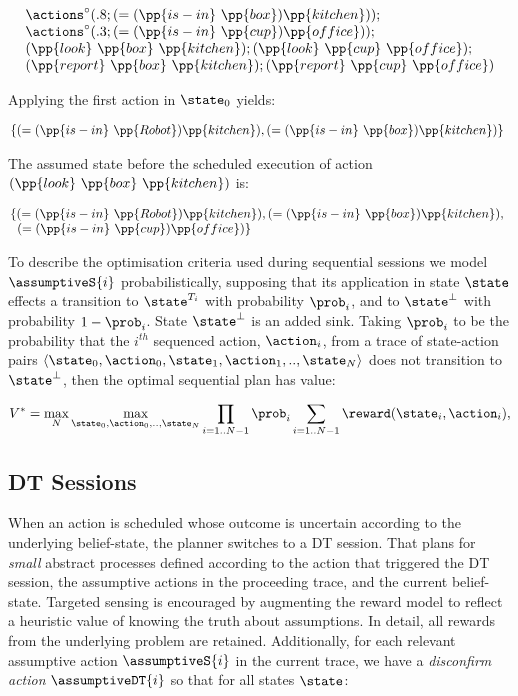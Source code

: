 \small
\[
\begin{array}{l}
\actions^{\circ}(.8;(=(\pp{is-in}~\pp{box})\pp{kitchen}));\\
\actions^{\circ}(.3;(=(\pp{is-in}~\pp{cup})\pp{office}));\\
(\pp{look}~\pp{box}~\pp{kitchen});
(\pp{look}~\pp{cup}~\pp{office});\\
(\pp{report}~\pp{box}~\pp{kitchen}); 
(\pp{report}~\pp{cup}~\pp{office})
\end{array}
\]
\normalsize

\noindent Applying the first action in $\state_0$ yields:


\small
\[
\hspace{-1ex}\begin{array}{l}
\{(=(\pp{is-in}~\pp{Robot})\pp{kitchen}),(=(\pp{is-in}~\pp{box})\pp{kitchen})\}
\end{array}
\]
\normalsize

\noindent The assumed state before the scheduled execution of
action $(\pp{look}~\pp{box}~\pp{kitchen})$ is:

\small
\[
\hspace{-1ex}\begin{array}{l}
\{(=(\pp{is-in}~\pp{Robot})\pp{kitchen}),
(=(\pp{is-in}~\pp{box})\pp{kitchen}), \\\;\;(=(\pp{is-in}~\pp{cup})\pp{office})\}
\end{array}
 \]
\normalsize

To describe the optimisation criteria used during sequential sessions
we model $\assumptiveS{i}$ probabilistically, supposing that its
application in state $\state$ effects a transition to $\state^{T_i}$
with probability $\prob_i$, and to $\state^\bot$ with probability $1 -
\prob_i$. State $\state^\bot$ is an added sink. Taking $\prob_i$ to be
the probability that the $i^{th}$ sequenced action, $\action_i$, from
a trace of state-action pairs $\langle \state_0, \action_0,\state_1,
\action_1,.., \state_N \rangle$ does not transition to $\state^\bot$,
then the optimal sequential plan has value:

\small
\[
V^* = \max_N \max_{\state_0, \action_0,.., \state_N} \prod_{i=1..N-1} \prob_i \sum_{i=1..N-1}
\reward(\state_i, \action_i),
\]
\normalsize

\subsection{DT Sessions}

When an action is scheduled whose outcome is uncertain according to
the underlying belief-state, the planner switches to a DT
session. That plans for {\em small} abstract processes defined
according to the action that triggered the DT session, the assumptive
actions in the proceeding trace, and the current
belief-state. Targeted sensing is encouraged by augmenting the reward
model to reflect a heuristic value of knowing the truth about
assumptions. In detail, all rewards from the underlying problem are
retained. Additionally, for each relevant assumptive action
$\assumptiveS{i}$ in the current trace, we have a {\em disconfirm
action} $\assumptiveDT{i}$ so that for all states $\state$:


